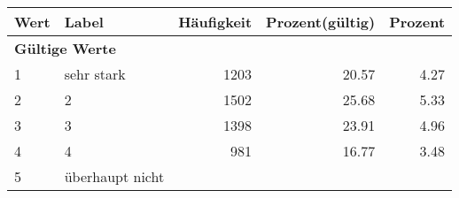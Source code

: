      \begin{longtable}{lXrrr}
     \toprule
     \textbf{Wert} & \textbf{Label} & \textbf{Häufigkeit} & \textbf{Prozent(gültig)} & \textbf{Prozent} \\
     \endhead
     \midrule
     \multicolumn{5}{l}{\textbf{Gültige Werte}}\\

     1 &
     \multicolumn{1}{X}{ sehr stark   } &


       \num{1203} &
       \num[round-mode=places,round-precision=2]{20,57} &
         \num[round-mode=places,round-precision=2]{4,27} \\

     2 &
     \multicolumn{1}{X}{ 2   } &


       \num{1502} &
       \num[round-mode=places,round-precision=2]{25,68} &
         \num[round-mode=places,round-precision=2]{5,33} \\

     3 &
     \multicolumn{1}{X}{ 3   } &


       \num{1398} &
       \num[round-mode=places,round-precision=2]{23,91} &
         \num[round-mode=places,round-precision=2]{4,96} \\

     4 &
     \multicolumn{1}{X}{ 4   } &


       \num{981} &
       \num[round-mode=places,round-precision=2]{16,77} &
         \num[round-mode=places,round-precision=2]{3,48} \\

     5 &
     \multicolumn{1}{X}{ überhaupt nicht   } &



\end{longtable}

